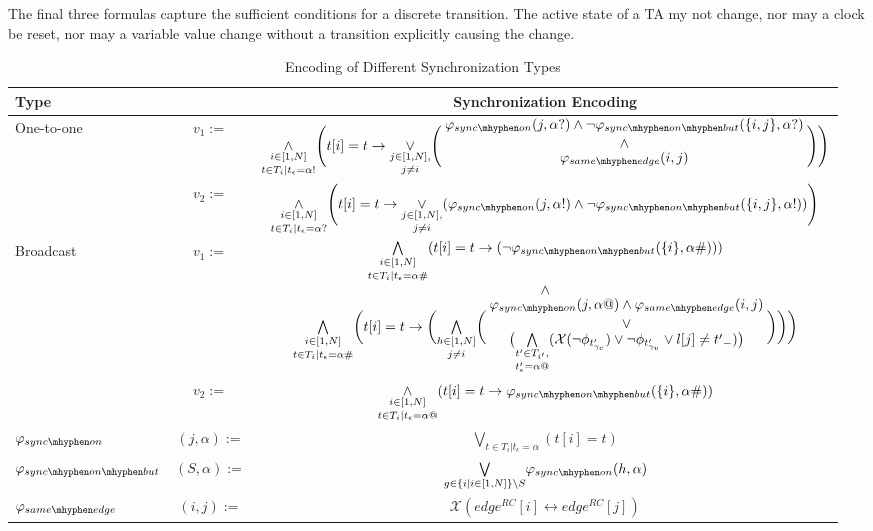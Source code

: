 \documentclass[a4paper,11pt]{report}
\renewcommand{\arraystretch}{1.0}
\theoremstyle{definition}
\begin{document}
The final three formulas capture the sufficient conditions for a discrete
transition. The active state of a TA my not change, nor may a clock be reset,
nor may a variable value change without a transition explicitly causing the
change.

\begin{table}[ht]
  \centering
  \renewcommand{\arraystretch}{1.5}
  \begin{tabular}{l c c}
    \toprule
    \textbf{Type} && \textbf{Synchronization Encoding} \\
    \midrule
    \multirow{2}{5em}{One-to-one}
                  & $v_{1} :=$ &
                                 $\underset{t \in T_{i}| t_{\epsilon} = \alpha!}{\underset{i \in [1,N]}{\land}} \Bigg( t[i] = t \rightarrow \underset{j \neq i}{\underset{j \in [1,N],}{\lor}} \Bigg( \genfrac{}{}{0pt}{0}{\genfrac{}{}{0pt}{0}{\varphi_{sync{\mhyphen}on}(j,\alpha?) \land \neg \varphi_{sync{\mhyphen}on{\mhyphen}but}(\{i,j\},\alpha?)}{\land}}{\varphi_{same{\mhyphen}edge}(i,j)} \Bigg) \Bigg)$
    \\
                  & $v_{2} :=$ &
                                 $\underset{t \in T_{i}| t_{\epsilon} = \alpha?}{\underset{i \in [1,N]}{\land}} \Bigg( t[i] = t \rightarrow \underset{j \neq i}{ \underset{j \in [1,N],}{\lor}}( \varphi_{sync{\mhyphen}on}(j,\alpha!) \land \neg \varphi_{sync{\mhyphen}on{\mhyphen}but}(\{i,j\}, \alpha!) ) \Bigg)$
    \\
    \midrule
    \multirow{2}{5em}{Broadcast}
                  & $v_{1} :=$ & $\genfrac{}{}{0pt}{0}{\genfrac{}{}{0pt}{0}{\underset{t \in T_{i}|t_{\epsilon} = \alpha \#}{\underset{i \in [1,N]}{\bigwedge}} (t[i] = t \rightarrow (\neg \varphi_{sync{\mhyphen}on{\mhyphen}but}(\{i\},\alpha \#)))}{\land}}{\underset{t \in T_{i}|t_{\epsilon}=\alpha \#}{\underset{i \in [1,N]}{\bigwedge}} \bigg( t[i]=t \rightarrow \bigg( \underset{j \neq i}{\underset{h \in [1,N]}{\bigwedge}} \bigg( \genfrac{}{}{0pt}{0}{\genfrac{}{}{0pt}{0}{\varphi_{sync{\mhyphen}on}(j,\alpha @) \land \varphi_{same{\mhyphen}edge}(i,j)}{\lor}}{\big( \underset{t_{\epsilon}' = \alpha @}{\underset{t' \in T_{i'},}{\bigwedge}} (\mathcal{X}(\neg \phi_{t_{\gamma_{c}}'}) \lor \neg \phi_{t_{\gamma_{v}}'} \lor l[j] \neq {t'}_{-}) \big)} \bigg) \bigg) \bigg)}$
    \\
                  & $v_{2} :=$ & $\underset{t \in T_{i}|t_{\epsilon} = \alpha @}{\underset{i \in [1,N]}{\land}} (t[i] = t \rightarrow \varphi_{sync{\mhyphen}on{\mhyphen}but}(\{i\},\alpha\#))$\\
    \midrule
                  $\varphi_{sync{\mhyphen}on}$&$(j,\alpha):=$ &$\underset{t \in T_{i} | t_{\epsilon} = \alpha}{\bigvee} (t[i] = t)$\\
                  $\varphi_{sync{\mhyphen}on{\mhyphen}but}$&$(S,\alpha):=$ & $\underset{g \in \{i|i \in [1,N]\}\backslash S}{\bigvee} \varphi_{sync{\mhyphen}on}(h,\alpha)$\\
                  $\varphi_{same{\mhyphen}edge}$&$(i,j):=$ & $\mathcal{X}(edge^{RC}[i] \leftrightarrow edge^{RC}[j])$\\
    \bottomrule
  \end{tabular}
  \caption{Encoding of Different Synchronization Types}
  \label{table:cltloc-sync}
\end{table}
\end{document}
